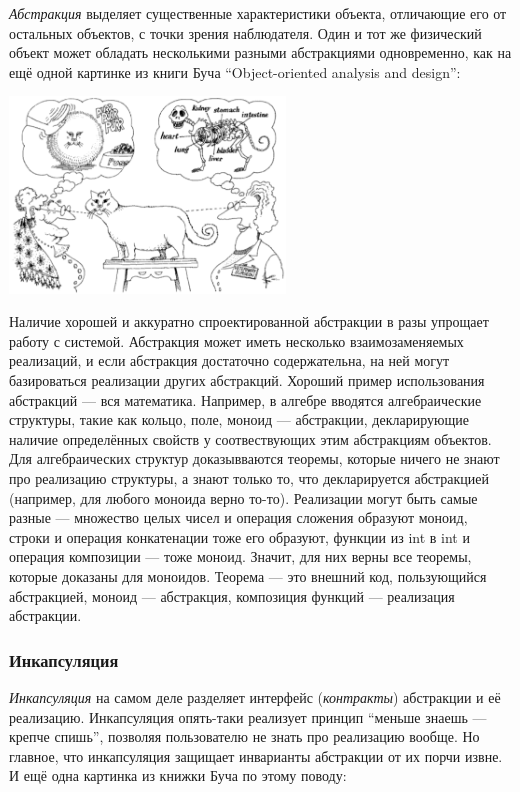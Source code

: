 \documentclass[a5paper]{article}
\begin{document}
\textit{Абстракция} выделяет существенные характеристики объекта, отличающие его от остальных объектов, с точки зрения наблюдателя. Один и тот же физический объект может обладать несколькими разными абстракциями одновременно, как на ещё одной картинке из книги Буча ``Object-oriented analysis and design'':

\begin{center}
	\includegraphics[width=0.55\textwidth]{abstraction.png}
\end{center}

Наличие хорошей и аккуратно спроектированной абстракции в разы упрощает работу с системой. Абстракция может иметь несколько взаимозаменяемых реализаций, и если абстракция достаточно содержательна, на ней могут базироваться реализации других абстракций. Хороший пример использования абстракций --- вся математика. Например, в алгебре вводятся алгебраические структуры, такие как кольцо, поле, моноид --- абстракции, декларирующие наличие определённых свойств у соотвествующих этим абстракциям объектов. Для алгебраических структур доказывваются теоремы, которые ничего не знают про реализацию структуры, а знают только то, что декларируется абстракцией (например, для любого моноида верно то-то). Реализации могут быть самые разные --- множество целых чисел и операция сложения образуют моноид, строки и операция конкатенации тоже его образуют, функции из int в int и операция композиции --- тоже моноид. Значит, для них верны все теоремы, которые доказаны для моноидов. Теорема --- это внешний код, пользующийся абстракцией, моноид --- абстракция, композиция функций --- реализация абстракции.

\subsubsection{Инкапсуляция}

\textit{Инкапсуляция} на самом деле разделяет интерфейс (\textit{контракты}) абстракции и её реализацию. Инкапсуляция опять-таки реализует принцип ``меньше знаешь --- крепче спишь'', позволяя пользователю не знать про реализацию вообще. Но главное, что инкапсуляция защищает инварианты абстракции от их порчи извне. И ещё одна картинка из книжки Буча по этому поводу:
\end{document}
